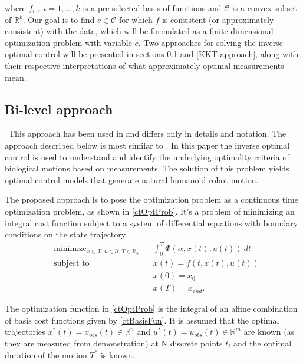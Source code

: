 \documentclass[12pt, a4paper]{article}
\DeclareMathOperator*{\minimize}{minimize}
\begin{document}
where \( f_i\;,\; i = 1,\ldots,k \) is a pre-selected basis of functions and \( \mathcal{C} \) is a convex subset of \( \mathbb{R}^k\). Our goal is to find \( c \in \mathcal{C} \) for which \( f \) is consistent (or approximately consistent) with the data, which will be formulated as a finite dimensional optimization problem with variable \( c \). Two approaches for solving the inverse optimal control will be presented in sections \ref{Bi-level approach} and \ref{KKT approach}, along with their respective interpretations of what approximately optimal measurements mean. \par
\subsection{Bi-level approach} \label{Bi-level approach}\
This approach has been used in \cite{mombaur2010human, clever2016inverse, berret2011evidence, sylla2014human} and differs only in details and notation. The approach described below is most similar to \cite{mombaur2010human}. In this paper the inverse optimal control is used to understand and identify the underlying optimality criteria of biological motions based on measurements. The solution of this problem yields optimal control models that generate natural humanoid robot motion.\par
The proposed approach is to pose the optimization problem as a continuous time optimization problem, as shown in \eqref{ctOptProb}. It's a problem of minimizing an integral cost function subject to a system of differential equations with boundary conditions on the state trajectory.
\begin{equation} \label{ctOptProb}
\begin{aligned}
&\minimize_{x\in\mathcal{X}, u\in\mathcal{U}, T\in\mathbb{R}_+} & &\int_0^T \Phi(\alpha, x(t), u(t)) \> dt \\
&\text{subject to}                                              & & \dot{x}(t) = f(t, x(t), u(t)) \\
&                                                               & & x(0) = x_0 \\
&                                                               & & x(T) = x_{end}.
\end{aligned}
\end{equation}\par
 The optimization function in \eqref{ctOptProb} is the integral of an affine combination of basis cost functions given by \eqref{ctBasisFun}. It is assumed that the optimal trajectories \( x^*(t) = x_{obs}(t) \in \mathbb{R}^n \) and \( u^*(t) = u_{obs}(t) \in \mathbb{R}^m \) are known (as they are measured from demonstration) at N discrete points \( t_i\) and the optimal duration of the motion \( T^* \) is known.
\end{document}

